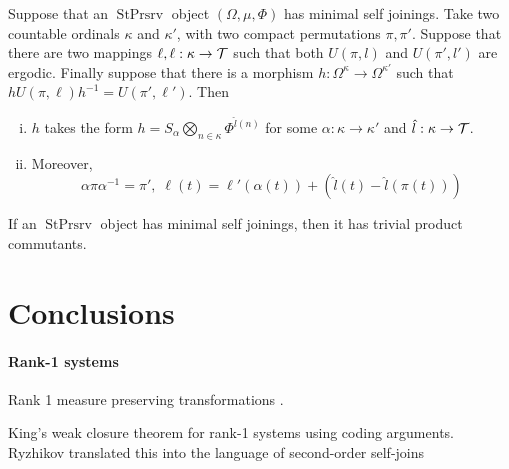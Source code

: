 \documentclass[12pt,oneside,pb-diagram]{article}
\DeclareMathOperator{\sps}{StPrsrv}
\begin{document}
\begin{definition} 
	
\end{definition}

\begin{lemma}
	\cite[Thm 3.1]{Rudolph1979join} Suppose that an $\sps$ object $(\Omega, \mu, \Phi)$ has minimal self joinings. Take two countable ordinals $\kappa$ and $\kappa'$, with two compact permutations $\pi , \pi'$. Suppose that there are two mappings $\ell, \ell : \kappa \to \mathcal{T}$ such that both $U(\pi, l)$ and $U(\pi', l')$ are ergodic. Finally suppose that there is a morphism $h : \Omega^{\kappa} \to \Omega^{\kappa'}$ such that $h U(\pi, \ell) h^{-1} = U(\pi', \ell')$. Then
	\begin{enumerate} [(i)]
		\item $h$ takes the form $h = S_\alpha \bigotimes_{n \in \kappa} \Phi^{\hat{l}(n)}$ for some $\alpha : \kappa \to \kappa'$ and $\hat{l} : \kappa \to \mathcal{T}$.
		\item Moreover,
		\[ \alpha \pi \alpha^{-1} = \pi', \; \ell(t) = \ell'(\alpha(t)) + (\hat{l}(t) - \hat{l}(\pi(t))) \]
	\end{enumerate}
\end{lemma}

\begin{lemma}
	\cite[Cor 3.2]{Rudolph1979join} If an $\sps$ object has minimal self joinings, then it has trivial product commutants.
\end{lemma}

\section{Conclusions} \label{sec:conclus}

\paragraph{Rank-1 systems} Rank 1 measure preserving transformations \cite[e.g.]{Ferenczi1997rank, Nadkarni1998book, Nadkarni2011book}.

King's weak closure theorem for rank-1 systems \cite{king1990map} using coding arguments. Ryzhikov \cite{Ryzhikov1993join} translated this into the language of second-order self-joins
\cite{rokhlin1949endo} \cite{Weiss1998mult} \cite{Glasner1994prop} 
\end{document}
